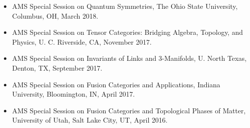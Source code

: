 \documentclass[11pt]{article}
\begin{document}
  \begin{itemize}
    \item[] AMS Special Session on Quantum Symmetries, The Ohio State University, Columbus, OH, March 2018.
    
    \item[] AMS Special Session on Tensor Categories: Bridging Algebra, Topology, and Physics, U. C. Riverside, CA, November 2017.

    \item[] AMS Special Session on Invariants of Links and 3-Manifolds, U. North Texas, Denton, TX, September 2017.

    \item[] AMS Special Session on Fusion Categories and Applications, Indiana University, Bloomington, IN, April 2017.

    \item[] AMS Special Session on Fusion Categories and Topological Phases of Matter, University of Utah, Salt Lake City, UT, April 2016.
  \end{itemize}
  
\end{document}
